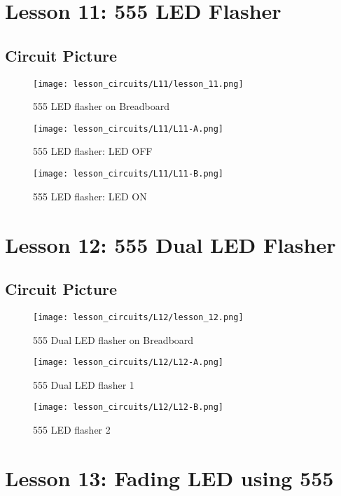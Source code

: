 \section{Lesson 11: 555 LED Flasher}
\subsection{Circuit Picture}
\begin{figure}[htp]
    \centering
    \texttt{[image: lesson\_circuits/L11/lesson\_11.png]}
    \caption{555 LED flasher on Breadboard}
    \label{fig:555_led_sch}
\end{figure}
\begin{figure}[htp]
    \centering
    \texttt{[image: lesson\_circuits/L11/L11-A.png]}
    \caption{555 LED flasher: LED OFF}
    \label{fig:555_led_obb}
\end{figure}
\begin{figure}[htp]
    \centering
    \texttt{[image: lesson\_circuits/L11/L11-B.png]}
    \caption{555 LED flasher: LED ON}
    \label{fig:555_led_obb1}
\end{figure}
\section{Lesson 12: 555 Dual LED Flasher}
\subsection{Circuit Picture}
\begin{figure}[htp]
    \centering
    \texttt{[image: lesson\_circuits/L12/lesson\_12.png]}
    \caption{555 Dual LED flasher on Breadboard}
    \label{fig:555_2led_sch}
\end{figure}
\begin{figure}[htp]
    \centering
    \texttt{[image: lesson\_circuits/L12/L12-A.png]}
    \caption{555 Dual LED flasher 1}
    \label{fig:555_2led_obb}
\end{figure}
\begin{figure}[htp]
    \centering
    \texttt{[image: lesson\_circuits/L12/L12-B.png]}
    \caption{555 LED flasher 2}
    \label{fig:555_2led_obb1}
\end{figure}
\section{Lesson 13: Fading LED using 555}
